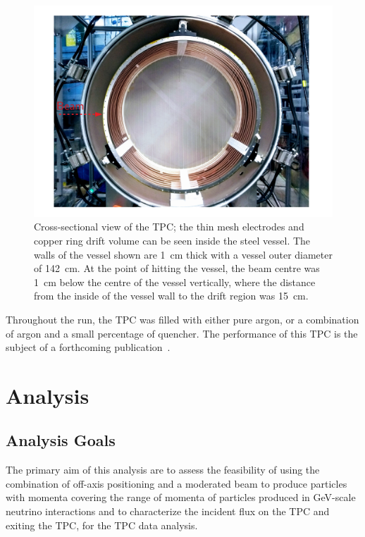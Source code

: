 \begin{figure}
  \centering
  \includegraphics[width=.88\linewidth]{files/Figures/vesselView.pdf}
  \caption{Cross-sectional view of the TPC; the thin mesh electrodes and copper ring drift volume can be seen inside the steel vessel. The walls of the vessel shown are 1~cm thick with a vessel outer diameter of 142~cm. At the point of hitting the vessel, the beam centre was 1~cm below the centre of the vessel vertically, where the distance from the inside of the vessel wall to the drift region was 15~cm.}
   \label{fig:TPC}
\end{figure}

Throughout the run, the TPC was filled with either pure argon, or a combination of argon and a small percentage of quencher.
The performance of this TPC is the subject of a forthcoming publication~\cite{Deisting:2020aaa}.

\section{Analysis}
\label{hptpcPaper:sec:Analysis}
\subsection{Analysis Goals}

The primary aim of this analysis are to assess the feasibility of using the combination of off-axis positioning and a moderated beam to produce particles with momenta covering the range of momenta of particles produced in GeV-scale neutrino interactions and to characterize the incident flux on the TPC and exiting the TPC, for the TPC data analysis.

